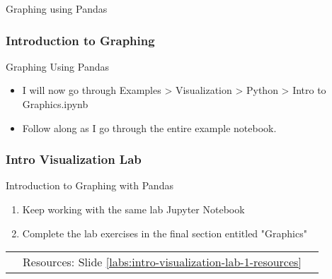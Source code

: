\documentclass[handout, 11pt]{beamer}
\begin{document}
\begin{section}[Graphs]{Graphing using Pandas}
\begin{frame}
\begin{adjustbox}{width=0.425\textwidth, height=0.8\textheight, keepaspectratio}
\end{adjustbox}
\end{frame}
\begin{frame}
\frametitle{Introduction to Graphing}
{
\begin{block}{Graphing Using Pandas}
\begin{itemize}
\item I will now go through Examples > Visualization > Python > Intro to Graphics.ipynb
\item Follow along as I go through the entire example notebook.
\end{itemize}
\end{block}
}
\end{frame}
\begin{frame}
\frametitle{Intro Visualization Lab}
{
\begin{block}{Introduction to Graphing with Pandas}
\begin{enumerate}
\item Keep working with the same lab Jupyter Notebook
\item Complete the lab exercises in the final section entitled "Graphics"
\end{enumerate}
\vfill
\begin{tabular*}{\textwidth}{@{\extracolsep{\fill}}ccc}
\toprule
\hfill & Resources: Slide \textcolor{blue}{\underline{\ref{labs:intro-visualization-lab-1-resources}}} & \hfill\\

\end{tabular*}
\end{block}
}
\label{labs:intro-visualization-lab-1}
\end{frame}
\end{section}
\appendix
{}
\setcounter{finalframe}{\value{framenumber}}
\end{document}
